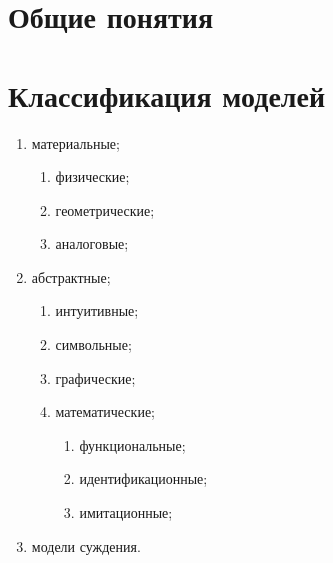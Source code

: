 
\section{Общие понятия}

\section{Классификация моделей}

\begin{enumerate}
	\item материальные;
	\begin{enumerate}
		\item физические;
		\item геометрические;
		\item аналоговые;
	\end{enumerate}
	\item абстрактные;
	\begin{enumerate}
		\item интуитивные;
		\item символьные;
		\item графические;
		\item математические;
		\begin{enumerate}
			\item функциональные;
			\item идентификационные;
			\item имитационные;
		\end{enumerate}
	\end{enumerate}
	\item модели суждения.
\end{enumerate}